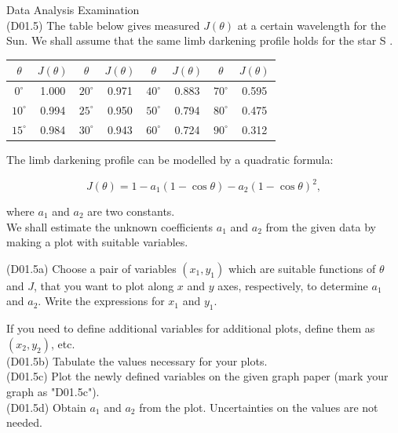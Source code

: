 \documentclass[10pt]{article}
\begin{document}
    Data Analysis Examination\\
    (D01.5) The table below gives measured $J(\theta)$ at a certain wavelength for the Sun. We shall assume that the same limb darkening profile holds for the star S .
    
    \begin{center}
    \begin{tabular}{|c|c|c|c|c|c|c|c|}
    \hline
    $\theta$ & $J(\theta)$ & $\theta$ & $J(\theta)$ & $\theta$ & $J(\theta)$ & $\theta$ & $J(\theta)$ \\
    \hline
    $0^{\circ}$ & 1.000 & $20^{\circ}$ & 0.971 & $40^{\circ}$ & 0.883 & $70^{\circ}$ & 0.595 \\
    \hline
    $10^{\circ}$ & 0.994 & $25^{\circ}$ & 0.950 & $50^{\circ}$ & 0.794 & $80^{\circ}$ & 0.475 \\
    \hline
    $15^{\circ}$ & 0.984 & $30^{\circ}$ & 0.943 & $60^{\circ}$ & 0.724 & $90^{\circ}$ & 0.312 \\
    \hline
    \end{tabular}
    \end{center}
    
    The limb darkening profile can be modelled by a quadratic formula:
    
    $$
    J(\theta)=1-a_{1}(1-\cos \theta)-a_{2}(1-\cos \theta)^{2},
    $$
    
    where $a_{1}$ and $a_{2}$ are two constants.\\
    We shall estimate the unknown coefficients $a_{1}$ and $a_{2}$ from the given data by making a plot with suitable variables.
    
    \begin{displayquote}
    (D01.5a) Choose a pair of variables $\left(x_{1}, y_{1}\right)$ which are suitable functions of $\theta$ and $J$, that you want to plot along $x$ and $y$ axes, respectively, to determine $a_{1}$ and $a_{2}$. Write the expressions for $x_{1}$ and $y_{1}$.
    \end{displayquote}
    
    If you need to define additional variables for additional plots, define them as $\left(x_{2}, y_{2}\right)$, etc.\\
    (D01.5b) Tabulate the values necessary for your plots.\\
    (D01.5c) Plot the newly defined variables on the given graph paper (mark your graph as "D01.5c").\\
    (D01.5d) Obtain $a_{1}$ and $a_{2}$ from the plot. Uncertainties on the values are not needed.
    
\end{document}
